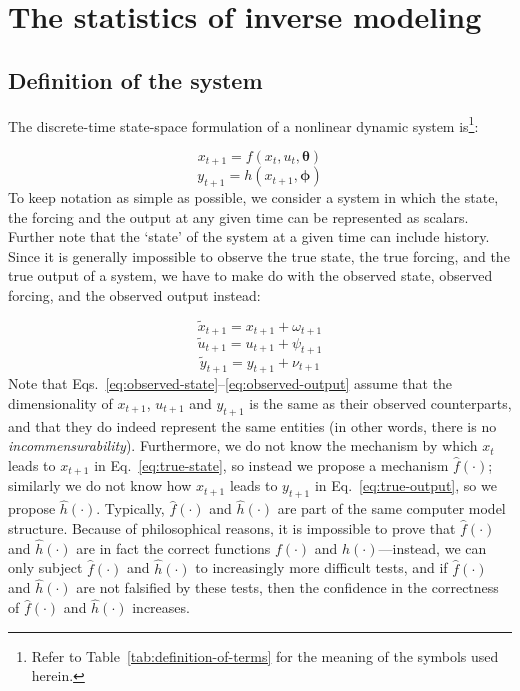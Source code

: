 \chapter{The statistics of inverse modeling}
\section{Definition of the system}

The discrete-time state-space formulation of a nonlinear dynamic system
is\footnote{Refer to Table~\ref{tab:definition-of-terms} for the meaning of the
symbols used herein.}:

\begin{equation}\label{eq:true-state}
x_{t+1}=f(x_t,u_t,\boldsymbol\theta)
\end{equation}
\begin{equation}\label{eq:true-output}
y_{t+1}=h(x_{t+1},\boldsymbol\phi)
\end{equation}
To keep notation as simple as possible, we consider a system in which the state,
the forcing and the output at any given time can be represented as scalars.
Further note that the `state' of the system at a given time can include history.
Since it is generally impossible to observe the true state, the true forcing,
and the true output of a system, we have to make do with the observed state,
observed forcing, and the observed output instead:

\begin{equation}\label{eq:observed-state}
\tilde{x}_{t+1}=x_{t+1} + \omega_{t+1}
\end{equation}
\begin{equation}\label{eq:observed-forcing}
\tilde{u}_{t+1}=u_{t+1} + \psi_{t+1}
\end{equation}
\begin{equation}\label{eq:observed-output}
\tilde{y}_{t+1}=y_{t+1} + \nu_{t+1}
\end{equation}
Note that Eqs.~\ref{eq:observed-state}--\ref{eq:observed-output} assume that the
dimensionality of $x_{t+1}$, $u_{t+1}$ and $y_{t+1}$ is the same as their
observed counterparts, and that they do indeed represent the same entities (in
other words, there is no \textit{incommensurability}). Furthermore, we do not
know the mechanism by which $x_t$ leads to $x_{t+1}$ in Eq.~\ref{eq:true-state},
so instead we propose a mechanism $\hat{f}(\cdot{})$; similarly we do not know
how $x_{t+1}$ leads to $y_{t+1}$ in Eq.~\ref{eq:true-output}, so we propose
$\hat{h}(\cdot{})$. Typically, $\hat{f}(\cdot{})$ and $\hat{h}(\cdot{})$ are
part of the same computer model structure. Because of philosophical reasons, it
is impossible to prove that $\hat{f}(\cdot{})$ and $\hat{h}(\cdot{})$ are in
fact the correct functions $f(\cdot{})$ and $h(\cdot{})$---instead, we can only
subject $\hat{f}(\cdot{})$ and $\hat{h}(\cdot{})$ to increasingly more difficult
tests, and if $\hat{f}(\cdot{})$ and $\hat{h}(\cdot{})$ are not falsified by
these tests, then the confidence in the correctness of $\hat{f}(\cdot{})$ and
$\hat{h}(\cdot{})$ increases.

